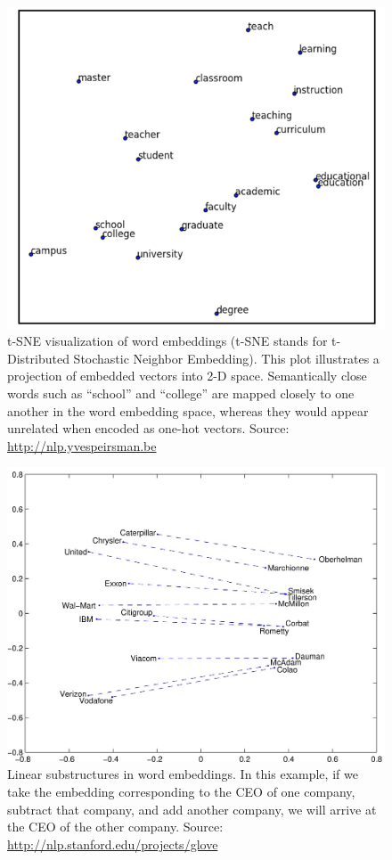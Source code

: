 \documentclass[justified, marginals=justified]{tufte-handout}
\begin{document}
\begin{figure}
  \includegraphics[width=1.0\linewidth]{embeddings2.png}
  \centering
  \caption{t-SNE visualization of word embeddings (t-SNE stands for t-Distributed Stochastic Neighbor Embedding). This plot illustrates a projection of embedded vectors into 2-D space. Semantically close words such as ``school'' and ``college'' are mapped closely to one another in the word embedding space, whereas they would appear unrelated when encoded as one-hot vectors. Source: \url{http://nlp.yvespeirsman.be}}
  \label{fig:embeddings2}
\end{figure}

\begin{figure}
  \includegraphics[width=1.0\linewidth]{word-embeddings-linear-substructures.png}
  \caption{Linear substructures in word embeddings. In this example, if we take the embedding corresponding to the CEO of one company, subtract that company, and add another company, we will arrive at the CEO of the other company. Source: \url{http://nlp.stanford.edu/projects/glove}}
  \label{fig:word-embeddings-linear-substructures}
\end{figure}
\end{document}
